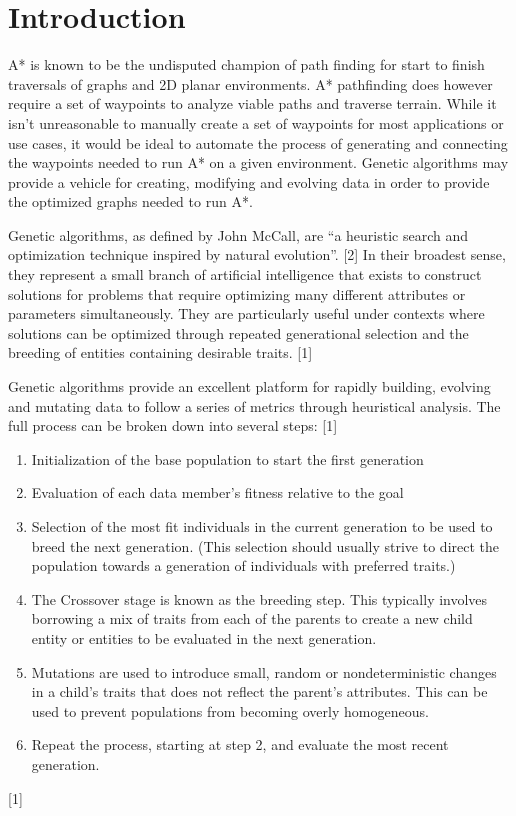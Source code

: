 \section{Introduction}
	A* is known to be the undisputed champion of path finding for start to finish traversals of graphs and 2D planar environments. A* pathfinding does however require a set of waypoints to analyze viable paths and traverse terrain. While it isn't unreasonable to manually create a set of waypoints for most applications or use cases, it would be ideal to automate the process of generating and connecting the waypoints needed to run A* on a given environment. Genetic algorithms may provide a vehicle for creating, modifying and evolving data in order to provide the optimized graphs needed to run A*.
	
	Genetic algorithms, as defined by John McCall, are “a heuristic search and optimization technique inspired by natural evolution”. [2] In their broadest sense, they represent a small branch of artificial intelligence that exists to construct solutions for problems that require optimizing many different attributes or parameters simultaneously. They are particularly useful under contexts where solutions can be optimized through repeated generational selection and the breeding of entities containing desirable traits. [1]
	
	Genetic algorithms provide an excellent platform for rapidly building, evolving and mutating data to follow a series of metrics through heuristical analysis. The full process can be broken down into several steps: [1]
	
	\begin{enumerate}
		\item Initialization of the base population to start the first generation
		\item Evaluation of each data member's fitness relative to the goal
		\item Selection of the most fit individuals in the current generation to be used to breed the next generation. (This selection should usually strive to direct the population towards a generation of individuals with preferred traits.)
		\item The Crossover stage is known as the breeding step. This typically involves borrowing a mix of traits from each of the parents to create a new child entity or entities to be evaluated in the next generation.
		\item Mutations are used to introduce small, random or nondeterministic changes in a child's traits that does not reflect the parent’s attributes. This can be used to prevent populations from becoming overly homogeneous.
		\item Repeat the process, starting at step 2, and evaluate the most recent generation.
	\end{enumerate}
	[1]
	
